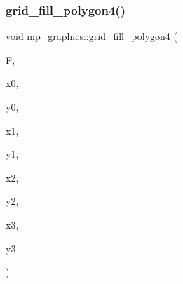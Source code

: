 \subsubsection{\texorpdfstring{grid\+\_\+fill\+\_\+polygon4()}{grid\_fill\_polygon4()}}
{\footnotesize\ttfamily void mp\+\_\+graphics\+::grid\+\_\+fill\+\_\+polygon4 (\begin{DoxyParamCaption}\item[{\mbox{\hyperlink{structgrid__frame}{grid\+\_\+frame}} $\ast$}]{F,  }\item[{\mbox{\hyperlink{galois_8h_a09fddde158a3a20bd2dcadb609de11dc}{I\+NT}}}]{x0,  }\item[{\mbox{\hyperlink{galois_8h_a09fddde158a3a20bd2dcadb609de11dc}{I\+NT}}}]{y0,  }\item[{\mbox{\hyperlink{galois_8h_a09fddde158a3a20bd2dcadb609de11dc}{I\+NT}}}]{x1,  }\item[{\mbox{\hyperlink{galois_8h_a09fddde158a3a20bd2dcadb609de11dc}{I\+NT}}}]{y1,  }\item[{\mbox{\hyperlink{galois_8h_a09fddde158a3a20bd2dcadb609de11dc}{I\+NT}}}]{x2,  }\item[{\mbox{\hyperlink{galois_8h_a09fddde158a3a20bd2dcadb609de11dc}{I\+NT}}}]{y2,  }\item[{\mbox{\hyperlink{galois_8h_a09fddde158a3a20bd2dcadb609de11dc}{I\+NT}}}]{x3,  }\item[{\mbox{\hyperlink{galois_8h_a09fddde158a3a20bd2dcadb609de11dc}{I\+NT}}}]{y3 }\end{DoxyParamCaption})}

\mbox{\label{classmp__graphics_ae1a25d835e13f3e2bad90972f5f68494}} 
